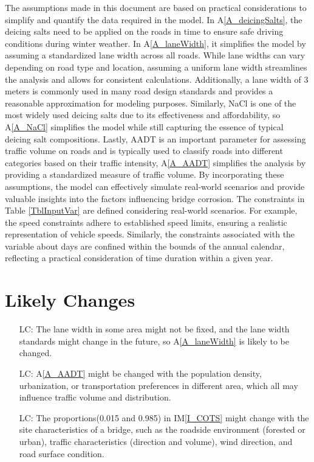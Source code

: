 \documentclass[12pt]{article}
\newcommand{\aref}[1]{A\ref{#1}}
\newcommand{\iref}[1]{IM\ref{#1}}
\newcounter{lcnum} %
\begin{document}
The assumptions made in this document are based on practical considerations to simplify and quantify the data required in the model. In \aref{A_deicingSalts}, the deicing salts need to be applied on the roads in time to ensure safe driving conditions during winter weather. In \aref{A_laneWidth}, it simplifies the model by assuming a standardized lane width across all roads. While lane widths can vary depending on road type and location, assuming a uniform lane width streamlines the analysis and allows for consistent calculations. Additionally, a lane width of 3 meters is commonly used in many road design standards and provides a reasonable approximation for modeling purposes. Similarly, NaCl is one of the most widely used deicing salts due to its effectiveness and affordability, so \aref{A_NaCl} simplifies the model while still capturing the essence of typical deicing salt compositions. Lastly, AADT is an important parameter for assessing traffic volume on roads and is typically used to classify roads into different categories based on their traffic intensity, \aref{A_AADT} simplifies the analysis by providing a standardized measure of traffic volume. By incorporating these assumptions, the model can effectively simulate real-world scenarios and provide valuable insights into the factors influencing bridge corrosion.
The constraints in Table \ref{TblInputVar} are defined considering real-world scenarios. For example,  the speed constraints adhere to established speed limits, ensuring a realistic representation of vehicle speeds. Similarly, the constraints associated with the variable about days are confined within the bounds of the annual calendar, reflecting a practical consideration of time duration within a given year.


\section{Likely Changes}    

\noindent \begin{itemize}

\item[LC\refstepcounter{lcnum}\thelcnum\label{LC_laneWidth}:] The lane width in some area might not be fixed, and the lane width standards might change in the future, so \aref{A_laneWidth} is likely to be changed. 
\item[LC\refstepcounter{lcnum}\thelcnum\label{LC_AADT}:] \aref{A_AADT} might be changed with the population density, urbanization, or transportation preferences in different area, which all may influence traffic volume and distribution.
\item[LC\refstepcounter{lcnum}\thelcnum\label{LC_SASC}:] The proportions(0.015 and 0.985) in \iref{I_COTS} might change with the site characteristics of a bridge, such as the roadside environment (forested or urban), traffic characteristics (direction and volume), wind direction, and road surface condition. 

\end{itemize}
\end{document}
